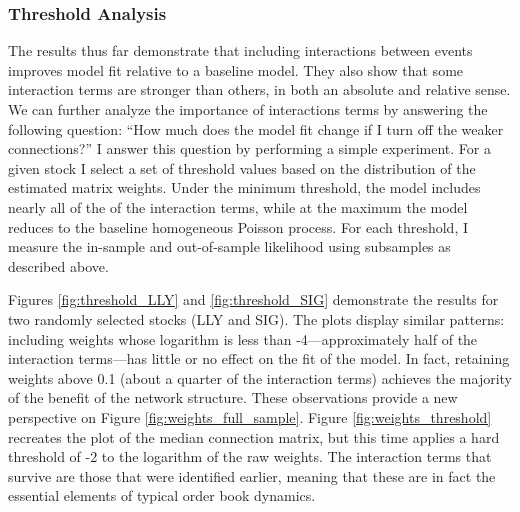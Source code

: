 		\subsubsection{Threshold Analysis}
			The results thus far demonstrate that including interactions between events improves model fit relative to a baseline model. They also show that some interaction terms are stronger than others, in both an absolute and relative sense. We can further analyze the importance of interactions terms by answering the following question: ``How much does the model fit change if I turn off the weaker connections?'' I answer this question by performing a simple experiment. For a given stock I select a set of threshold values based on the distribution of the estimated matrix weights. Under the minimum threshold, the model includes nearly all of the of the interaction terms, while at the maximum the model reduces to the baseline homogeneous Poisson process. For each threshold, I measure the in-sample and out-of-sample likelihood using subsamples as described above.

			Figures \ref{fig:threshold_LLY} and \ref{fig:threshold_SIG} demonstrate the results for two randomly selected stocks (LLY and SIG). The plots display similar patterns: including weights whose logarithm is less than -4---approximately half of the interaction terms---has little or no effect on the fit of the model. In fact, retaining weights above 0.1 (about a quarter of the interaction terms) achieves the majority of the benefit of the network structure. These observations provide a new perspective on Figure \ref{fig:weights_full_sample}. Figure \ref{fig:weights_threshold} recreates the plot of the median connection matrix, but this time applies a hard threshold of -2 to the logarithm of the raw weights. The interaction terms that survive are those that were identified earlier, meaning that these are in fact the essential elements of typical order book dynamics.

